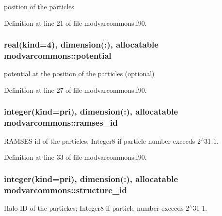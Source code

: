 position of the particles 



Definition at line 21 of file modvarcommons.\-f90.

\hypertarget{classmodvarcommons_a2c88b0f5e49a7236083aefd81aa33877}{
\subsubsection[{potential}]{\setlength{\rightskip}{0pt plus 5cm}real(kind=4), dimension(\-:), allocatable modvarcommons\-::potential}}\label{classmodvarcommons_a2c88b0f5e49a7236083aefd81aa33877}


potential at the position of the particles (optional) 



Definition at line 27 of file modvarcommons.\-f90.

\hypertarget{classmodvarcommons_acd431fedb7c6f3075a86103784aba97f}{
\subsubsection[{ramses\-\_\-id}]{\setlength{\rightskip}{0pt plus 5cm}integer(kind=pri), dimension(\-:), allocatable modvarcommons\-::ramses\-\_\-id}}\label{classmodvarcommons_acd431fedb7c6f3075a86103784aba97f}


R\-A\-M\-S\-E\-S id of the particles; Integer8 if particle number exceeds 2$^\wedge$31-\/1. 



Definition at line 33 of file modvarcommons.\-f90.

\hypertarget{classmodvarcommons_aa00fdd8871a32c56cc03a4b25e272346}{
\subsubsection[{structure\-\_\-id}]{\setlength{\rightskip}{0pt plus 5cm}integer(kind=pri), dimension(\-:), allocatable modvarcommons\-::structure\-\_\-id}}\label{classmodvarcommons_aa00fdd8871a32c56cc03a4b25e272346}


Halo I\-D of the partickes; Integer8 if particle number exceeds 2$^\wedge$31-\/1. 



